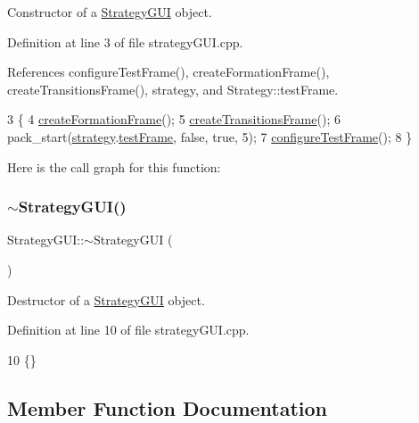 Constructor of a \hyperlink{class_strategy_g_u_i}{Strategy\+G\+UI} object. 



Definition at line 3 of file strategy\+G\+U\+I.\+cpp.



References configure\+Test\+Frame(), create\+Formation\+Frame(), create\+Transitions\+Frame(), strategy, and Strategy\+::test\+Frame.


\begin{DoxyCode}
3                          \{
4     \hyperlink{class_strategy_g_u_i_a38540d2d52e6bd3955e85adce92dac41}{createFormationFrame}();
5     \hyperlink{class_strategy_g_u_i_ab39aceb2dc4fc8b0b571d9284c463b5a}{createTransitionsFrame}();
6     pack\_start(\hyperlink{class_strategy_g_u_i_af8e7b112adca9d3de45cbb0ab00a80bb}{strategy}.\hyperlink{class_strategy_a6fabfc409deb567f30bae2150cfbafad}{testFrame}, \textcolor{keyword}{false}, \textcolor{keyword}{true}, 5);
7     \hyperlink{class_strategy_g_u_i_aaeb2b9affadab5eafc8885f983a1cc36}{configureTestFrame}();
8 \}
\end{DoxyCode}
Here is the call graph for this function\+:
\mbox{\label{class_strategy_g_u_i_a3957136621bf4eeeb13df4340b2fcb93}} 
\subsubsection{\texorpdfstring{$\sim$\+Strategy\+G\+U\+I()}{~StrategyGUI()}}
{\footnotesize\ttfamily Strategy\+G\+U\+I\+::$\sim$\+Strategy\+G\+UI (\begin{DoxyParamCaption}{ }\end{DoxyParamCaption})}



Destructor of a \hyperlink{class_strategy_g_u_i}{Strategy\+G\+UI} object. 



Definition at line 10 of file strategy\+G\+U\+I.\+cpp.


\begin{DoxyCode}
10 \{\}
\end{DoxyCode}


\subsection{Member Function Documentation}
\mbox{\label{class_strategy_g_u_i_ada313ae77f231e7007ac83753cbdb5dc}} 
